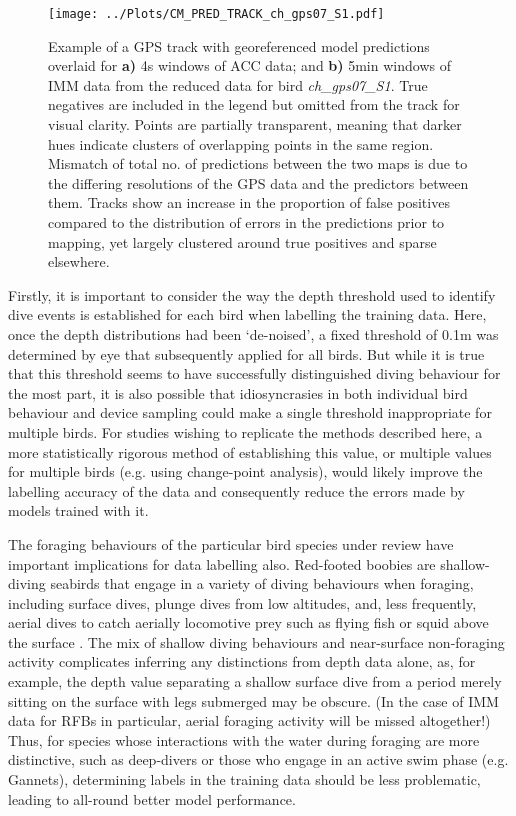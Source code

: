 \documentclass[11pt]{article}
\begin{document}
    \begin{figure}
	    \centering\texttt{[image: ../Plots/CM\_PRED\_TRACK\_ch\_gps07\_S1.pdf]}
	    \caption{Example of a GPS track with georeferenced model predictions overlaid  for \textbf{a)} 4s windows of ACC data; and \textbf{b)} 5min windows of IMM data from the reduced data for bird \emph{ch\_gps07\_S1}. True negatives are included in the legend but omitted from the track for visual clarity. Points are partially transparent, meaning that darker hues indicate clusters of overlapping points in the same region. Mismatch of total no. of predictions between the two maps is due to the differing resolutions of the GPS data and the predictors between them. Tracks show an increase in the proportion of false positives compared to the distribution of errors in the predictions prior to mapping, yet largely clustered around true positives and sparse elsewhere.}
    \end{figure}
    
    Firstly, it is important to consider the way the depth threshold used to identify dive events is established for each bird when labelling the training data. Here, once the depth distributions had been ‘de-noised’,  a fixed threshold of 0.1m was determined by eye that subsequently applied for all birds. But while it is true that this threshold seems to have successfully distinguished diving behaviour for the most part, it is also possible that idiosyncrasies in both individual bird behaviour and device sampling could make a single threshold inappropriate for multiple birds. 
    For studies wishing to replicate the methods described here, a more statistically rigorous method of establishing this value, or multiple values for multiple birds (e.g. using change-point analysis), would likely improve the labelling accuracy of the data and consequently reduce the errors made by models trained with it.
    
    The foraging behaviours of the particular bird species under review have important implications for data labelling also. Red-footed boobies are shallow-diving seabirds that engage in a variety of diving behaviours when foraging, including surface dives, plunge dives from low altitudes, and, less frequently, aerial dives to catch aerially locomotive prey such as flying fish or squid above the surface \citep{weimerskirch2005three,diamond1974red,pitman1993booby}. The mix of shallow diving behaviours and near-surface non-foraging activity complicates inferring any distinctions from depth data alone, as, for example, the depth value separating a shallow surface dive from a period merely sitting on the surface with legs submerged may be obscure. (In the case of IMM data for RFBs in particular, aerial foraging activity will be missed altogether!) Thus, for species whose interactions with the water during foraging are more distinctive, such as deep-divers or those who engage in an active swim phase (e.g. Gannets), determining labels in the training data should be less problematic, leading to all-round better model performance.
    
\end{document}
